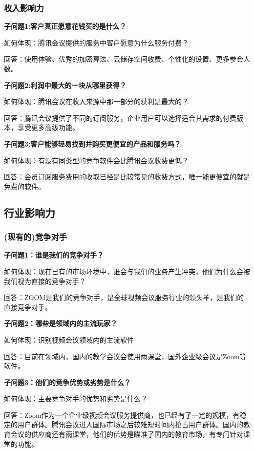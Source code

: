 \documentclass[a4paper,12pt]{article}
\begin{document}
    \subsubsection{收入影响力}
    \textbf{子问题1:客户真正愿意花钱买的是什么？}

    如何体现：腾讯会议提供的服务中客户愿意为什么服务付费？

    回答：使⽤体验、优秀的加密算法、云储存空间收费、个性化的设置、更多参会⼈数。
    
    \textbf{子问题2:利润中最大的一块从哪里获得？}

    如何体现：腾讯会议在收⼊来源中那⼀部分的获利是最⼤的？

    回答：腾讯会议提供了不同的订阅服务，企业用户可以选择适合其需求的付费版本，享受更多高级功能。
    
    \textbf{子问题3:客户能够轻易找到并购买更便宜的产品和服务吗？}

    如何体现：有没有同类型的竞争软件会⽐腾讯会议收费更低？

    回答：会员订阅服务费用的收取已经是⽐较常⻅的收费⽅式，唯⼀能更便宜的就是免费的软件。
    
    \subsection{行业影响力}
    \subsubsection{(现有的)竞争对手}
    \textbf{子问题1：谁是我们的竞争对手？}

    如何体现：现在已有的市场环境中，谁会与我们的业务产⽣冲突，他们为什么会被我们视为直接的竞争对⼿？

    回答：ZOOM是我们的竞争对⼿，是全球视频会议服务⾏业的领头⽺，是我们的直接竞争对⼿。
    

    \textbf{子问题2：哪些是领域内的主流玩家？}

    如何体现：识别视频会议领域内的主流软件

    回答：⽬前在领域内，国内的教学会议会使⽤⾬课堂，国外企业级会议是Zoom等软件。
    
    \textbf{子问题3：他们的竞争优势或劣势是什么？}

    如何体现：主要竞争对⼿的优势和劣势是什么？

    回答：Zoom作为⼀个企业级视频会议服务提供商，也已经有了⼀定的规模，有稳定的⽤户群体。腾讯会议进⼊国际市场之后较难短时间内抢占⽤户群体。国内的教育会议的供应商还有⾬课堂，他们的优势是瞄准了国内的教育市场，有专⻔针对课堂的功能。
    
\end{document}
